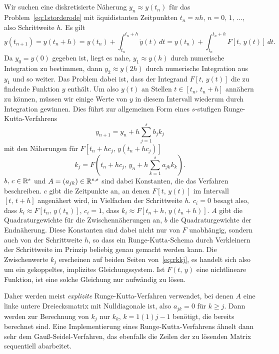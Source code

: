 \subsection{}

Wir suchen eine diskretisierte Näherung $y_n \approx y(t_n)$
für das Problem~\eqref{eq:1storderode} mit
äquidistanten Zeitpunkten $t_n=n h$, $n=0,\,1,\,\ldots$, also Schrittweite
$h$. Es gilt
\begin{equation}
  y(t_{n+1}) = y(t_n+h) = y(t_n) + \int_{t_n}^{t_n+h} \dot y(t)\,dt
  =  y(t_n) + \int_{t_n}^{t_n+h} F[t,\, y(t)]\,dt.
\end{equation}
Da $y_0 = y(0)$ gegeben ist, liegt es nahe, $y_1 \approx y(h)$ durch
numerische Integration zu bestimmen, dann $y_2 \approx y(2h)$ durch
numerische Integration aus $y_1$ und so weiter. Das Problem dabei ist,
dass der Integrand $F[t,\, y(t)]$ die zu findende Funktion $y$
enthält. Um also $y(t)$ an Stellen $t\in [t_n,\, t_n + h]$ annähern zu
können, müssen wir einige Werte von $y$ in diesem Intervall wiederum
durch Integration gewinnen. Dies führt zur allgemeinen Form eines
$s$-stufigen Runge-Kutta-Verfahrens
\begin{equation}
  y_{n+1} = y_n + h\sum_{j=1}^s b_j k_j
\end{equation}
mit den Näherungen für $F[t_n + hc_j,\, y(t_n + h c_j)]$
\begin{equation}
  \label{eq:rkkj}
  k_j = F\left(t_n + h c_j,\, y_n + h \sum_{k=1}^s a_{jk} k_k\right).
\end{equation}
$b,\,c\in\mathbb{R}^s$ und $A=(a_{jk})\in\mathbb{R}^{s,s}$ sind dabei Konstanten,
die das Verfahren beschreiben. $c$ gibt die Zeitpunkte an, an denen
$F[t,\,y(t)]$ im Intervall $[t,\,t+h]$ angenähert wird, in Vielfachen
der Schrittweite $h$. $c_i=0$ besagt also, dass $k_i\approx
F[t_n,\,y(t_n)]$, $c_i=1$, dass $k_i\approx F[t_n + h,\,y(t_n + h)]$.
$A$ gibt die Quadraturgewichte für die Zwischennäherungen an, $b$ die
Quadraturgewichte der Endnäherung. Diese Konstanten sind dabei nicht
nur von $F$ unabhängig, sondern auch von der Schrittweite $h$, so dass
ein Runge-Kutta-Schema durch Verkleinern der Schrittweite im Prinzip
beliebig genau gemacht werden kann.  Die Zwischenwerte $k_j$
erscheinen auf beiden Seiten von~\eqref{eq:rkkj}, es handelt sich also
um ein gekoppeltes, implizites Gleichungssystem.  Ist
$F(t,\,y)$ eine nichtlineare Funktion, ist eine solche Gleichung nur
aufwändig zu lösen.

%
Daher werden meist \emph{explizite} Runge-Kutta-Verfahren verwendet,
bei denen $A$ eine linke untere Dreiecksmatrix mit Nulldiagonale ist,
also $a_{jk} = 0$ für $k\ge j$. Dann werden zur Berechnung von $k_j$
nur $k_k$, $k=1(1)j-1$ benötigt, die bereits berechnet sind. Eine
Implementierung eines Runge-Kutta-Verfahrens ähnelt dann sehr dem
Gauß-Seidel-Verfahren, das ebenfalls die Zeilen der zu lösenden
Matrix sequentiell abarbeitet.

